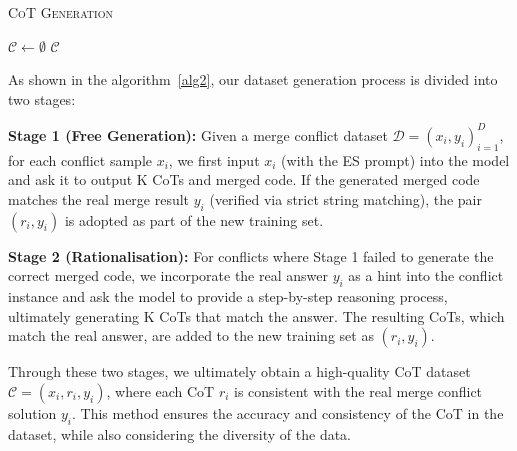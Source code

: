 \documentclass[sigconf,review,anonymous]{acmart}
\begin{document}
\begin{algorithm}[t]
\caption{\textsc{CoT Generation}}\label{alg2}
\BlankLine
$\mathcal{C} \gets \emptyset$\;
\Return $\mathcal{C}$\;
\end{algorithm}

As shown in the algorithm~\ref{alg2}, our dataset generation process is divided into two stages:

\textbf{Stage 1 (Free Generation):} Given a merge conflict dataset $\mathcal{D}={(x_i,y_i)}_{i=1}^{D}$, for each conflict sample $x_i$, we first input $x_i$ (with the ES prompt) into the model and ask it to output K CoTs and merged code. If the generated merged code matches the real merge result $y_i$ (verified via strict string matching), the pair $(r_i, y_i)$ is adopted as part of the new training set.

\textbf{Stage 2 (Rationalisation):} For conflicts where Stage 1 failed to generate the correct merged code, we incorporate the real answer $y_i$ as a hint into the conflict instance and ask the model to provide a step-by-step reasoning process, ultimately generating K CoTs that match the answer. 
The resulting CoTs, which match the real answer, are added to the new training set as $(r_i, y_i)$.

Through these two stages, we ultimately obtain a high-quality CoT dataset $\mathcal{C}={(x_i, r_i, y_i)}$, where each CoT $r_i$ is consistent with the real merge conflict solution $y_i$. This method ensures the accuracy and consistency of the CoT in the dataset, while also considering the diversity of the data.
\end{document}
